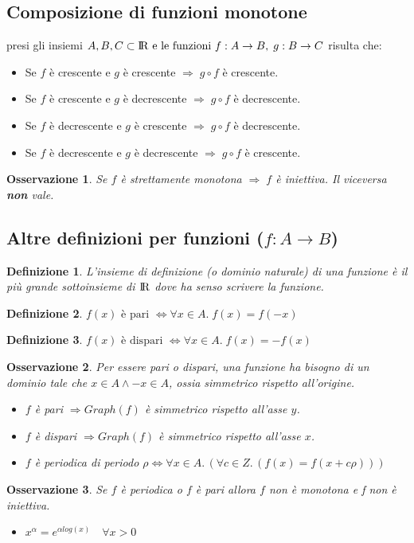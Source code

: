 \documentclass[12pt, a4paper]{article}
\theoremstyle{break}
\newtheorem{definition}{Definizione}[subsection]
\newtheorem{observation}{Osservazione}[subsection]
\newcommand\R{{\rm I\!R}}
\begin{document}
    \subsection{Composizione di funzioni monotone}
    presi gli insiemi $A,B,C\subset\R\text{ e le funzioni }f:A\rightarrow B,\; g:B\rightarrow C$ risulta che:
    \begin{itemize}
        \item Se $f$ è crescente e $g$ è crescente $\Rightarrow\; g\circ f$ è crescente. 
        \item Se $f$ è crescente e $g$ è decrescente $\Rightarrow\; g\circ f$ è decrescente. 
        \item Se $f$ è decrescente e $g$ è crescente $\Rightarrow\; g\circ f$ è decrescente. 
        \item Se $f$ è decrescente e $g$ è decrescente $\Rightarrow\; g\circ f$ è crescente. 
    \end{itemize}
    \begin{observation}
        Se $f$ è strettamente monotona $\Rightarrow\; f$ è iniettiva. Il viceversa \textbf{non} vale.
    \end{observation}
    \subsection{Altre definizioni per funzioni ($f:A\rightarrow B$)}
    \begin{definition}
        L'insieme di definizione (o dominio naturale) di una funzione è il più grande sottoinsieme di $\R$ dove ha senso scrivere la funzione.
    \end{definition}
    \begin{definition}
        $f(x) \text{ è pari }\Leftrightarrow \forall x\in A.\; f(x) = f(-x)$
    \end{definition}
    \begin{definition}
        $f(x) \text{ è dispari }\Leftrightarrow \forall x\in A.\; f(x) = -f(x)$   
    \end{definition}
    \begin{observation}
        Per essere pari o dispari, una funzione ha bisogno di un dominio tale che $x\in A \wedge -x\in A$, ossia simmetrico rispetto all'origine.
        \begin{itemize}
            \item$f$ è pari $\Rightarrow Graph(f)$ è simmetrico rispetto all'asse $y$.
            \item$f$ è dispari $\Rightarrow Graph(f)$ è simmetrico rispetto all'asse $x$.
            \item$f$ è periodica di periodo $\rho \Leftrightarrow \forall x\in A.\,(\forall c\in Z.\,(f(x) = f(x+c\rho)))$        
        \end{itemize}
    \end{observation}
    \begin{observation}
        Se $f$ è periodica o $f$ è pari allora $f$ non è monotona e f non è iniettiva.
        \begin{itemize}
            \item $x^\alpha = e^{\alpha log(x)}\quad\forall x > 0$
        \end{itemize}
    \end{observation}
\end{document}
